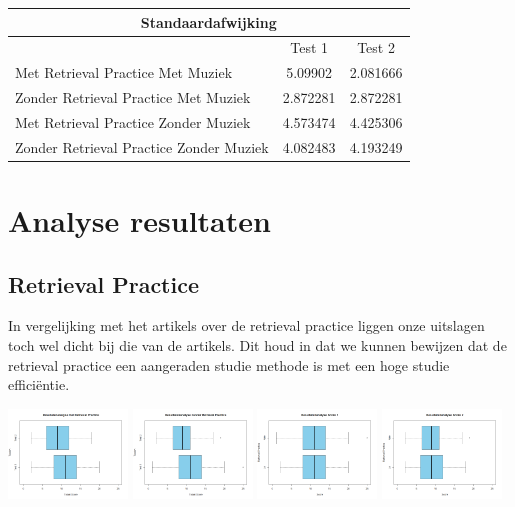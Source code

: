 \documentclass{hogent-article}
\begin{document}
	\begin{tabular}{ |p{10em}|c|c| }
	\hline
		\multicolumn{3}{|c|}{Standaardafwijking} \\
	\hline
		& Test 1 & Test 2 \\
	\hline
		Met Retrieval Practice Met Muziek  & 5.09902 & 2.081666 \\
	\hline
		Zonder Retrieval Practice Met Muziek & 2.872281 & 2.872281 \\
	\hline
		Met Retrieval Practice Zonder Muziek & 4.573474  & 4.425306 \\
	\hline
		Zonder Retrieval Practice Zonder Muziek & 4.082483 & 4.193249 \\
	\hline
	\end{tabular}
			
	\section{Analyse resultaten} %
	\subsection{Retrieval Practice}
	In vergelijking met het artikels over de retrieval practice \autocite{butler2010repeated, pyc2012test, karpicke2007repeated, karpicke2008critical} liggen onze uitslagen toch wel dicht bij die van de artikels. Dit houd in dat we kunnen bewijzen dat de retrieval practice een aangeraden studie methode is met een hoge studie efficiëntie.
	
	\includegraphics[width=120px]{Rplot_MetRetrievalPractice}
	\includegraphics[width=120px]{Rplot_ZonderRetrievalPractice}
	\includegraphics[width=120px]{Rplot_RetrievalPractice_Score1}
	\includegraphics[width=120px]{Rplot_RetrievalPractice_Score2}
	
\end{document}
